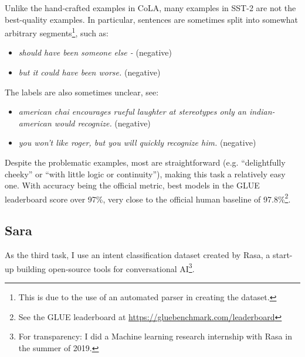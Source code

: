 \documentclass[bsc,frontabs,twoside,singlespacing,parskip,deptreport]{infthesis}
\begin{document}
{{{      Unlike the hand-crafted examples in CoLA, many examples in SST-2 are not the best-quality examples. In particular, sentences are sometimes split into somewhat arbitrary segments\footnote{This is due to the use of an automated parser in creating the dataset.}, such as:
      \begin{itemize}
        \item \textit{should have been someone else - } (negative)
        \item \textit{but it could have been worse.} (negative)
      \end{itemize}
      
      The labels are also sometimes unclear, see:
      \begin{itemize}
        \item \textit{american chai encourages rueful laughter at stereotypes only an indian-american would recognize.} (negative)
        \item \textit{you won't like roger, but you will quickly recognize him.} (negative)
      \end{itemize}

      Despite the problematic examples, most are straightforward (e.g. ``delightfully cheeky'' or ``with little logic or continuity''), making this task a relatively easy one. With accuracy being the official metric, best models in the GLUE leaderboard score over 97\%, very close to the official human baseline of 97.8\%\footnote{See the GLUE leaderboard at \url{https://gluebenchmark.com/leaderboard}}.
    }

    \subsection{Sara}{
      \label{sec:datasets-Sara}

      As the third task, I use an intent classification dataset created by Rasa, a start-up building open-source tools for conversational AI\footnote{For transparency: I did a Machine learning research internship with Rasa in the summer of 2019.}.

}}}
\end{document}
